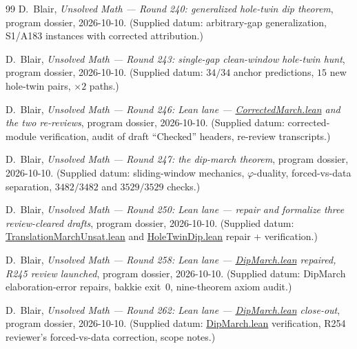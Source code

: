 \documentclass[11pt,a4paper]{article}
\theoremstyle{definition}
\begin{document}
\begin{thebibliography}{99}
D.~Blair,
\emph{Unsolved Math --- Round 240: generalized hole-twin dip theorem},
program dossier, 2026-10-10.
(Supplied datum: arbitrary-gap generalization, S1/A183 instances
with corrected attribution.)

D.~Blair,
\emph{Unsolved Math --- Round 243: single-gap clean-window hole-twin
hunt},
program dossier, 2026-10-10.
(Supplied datum: $34/34$ anchor predictions, $15$ new hole-twin
pairs, $\times2$ paths.)

D.~Blair,
\emph{Unsolved Math --- Round 246: Lean lane ---
\url{CorrectedMarch.lean} and the two re-reviews},
program dossier, 2026-10-10.
(Supplied datum: corrected-module verification, audit of draft
``Checked'' headers, re-review transcripts.)

D.~Blair,
\emph{Unsolved Math --- Round 247: the dip-march theorem},
program dossier, 2026-10-10.
(Supplied datum: sliding-window mechanics, $\varphi$-duality,
forced-vs-data separation, $3482/3482$ and $3529/3529$ checks.)

D.~Blair,
\emph{Unsolved Math --- Round 250: Lean lane --- repair and formalize
three review-cleared drafts},
program dossier, 2026-10-10.
(Supplied datum: \url{TranslationMarchUnsat.lean} and
\url{HoleTwinDip.lean} repair + verification.)

D.~Blair,
\emph{Unsolved Math --- Round 258: Lean lane --- \url{DipMarch.lean}
repaired, R245 review launched},
program dossier, 2026-10-10.
(Supplied datum: DipMarch elaboration-error repairs, bakkie exit~0,
nine-theorem axiom audit.)

D.~Blair,
\emph{Unsolved Math --- Round 262: Lean lane ---
\url{DipMarch.lean} close-out},
program dossier, 2026-10-10.
(Supplied datum: \url{DipMarch.lean} verification, R254 reviewer's
forced-vs-data correction, scope notes.)

\end{thebibliography}
\end{document}

